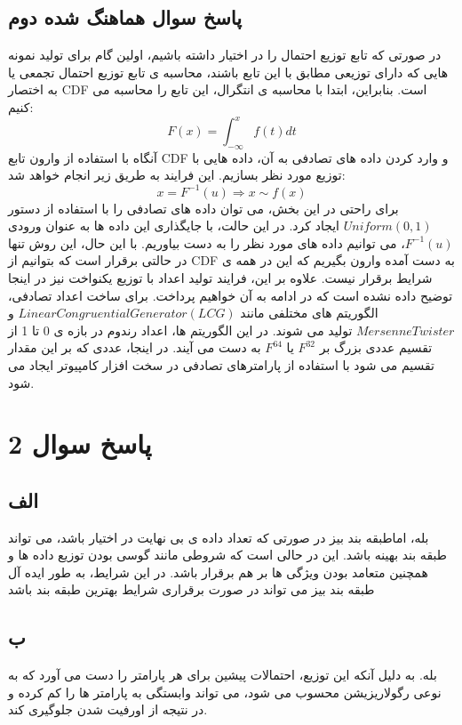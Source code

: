 \documentclass{article}
\begin{document}
\clearpage
\subsection{پاسخ سوال هماهنگ شده دوم}
در صورتی که تابع توزیع احتمال را در اختیار داشته باشیم، اولین گام برای تولید نمونه هایی که دارای توزیعی مطابق با این تابع باشند، محاسبه ی تابع توزیع احتمال تجمعی یا به اختصار CDF است. بنابراین، ابتدا با محاسبه ی انتگرال، این تابع را محاسبه می کنیم:
\begin{equation}
	F(x) = \int_{-\infty}^{x} f(t) dt
\end{equation}
آنگاه با استفاده از وارون تابع CDF و وارد کردن داده های تصادفی به آن، داده هایی با توزیع مورد نظر بسازیم. این فرایند به طریق زیر انجام خواهد شد:
\begin{equation}
	x = F^{-1}(u) \Rightarrow x \sim f(x)
\end{equation}
برای راحتی در این بخش، می توان داده های تصادفی را با استفاده از دستور $Uniform(0,1)$ ایجاد کرد. در این حالت، با جایگذاری این داده ها به عنوان ورودی $ F^{-1}(u)$، می توانیم داده های مورد نظر را به دست بیاوریم. با این حال، این روش تنها در حالتی برقرار است که بتوانیم از CDF به دست آمده وارون بگیریم که این در همه ی شرایط برقرار نیست. علاوه بر این، فرایند تولید اعداد با توزیع یکنواخت نیز در اینجا توضیح داده نشده است که در ادامه به آن خواهیم پرداخت.
برای ساخت اعداد تصادفی، الگوریتم های مختلفی مانند $Linear Congruential Generator (LCG)$ و $Mersenne Twister$ تولید می شوند. در این الگوریتم ها، اعداد رندوم در بازه ی 0 تا 1 از تقسیم عددی بزرگ بر $ F^{32}$ یا $ F^{64}$ به دست می آیند. در اینجا، عددی که بر این مقدار تقسیم می شود با استفاده از پارامترهای تصادفی در سخت افزار کامپیوتر ایجاد می شود.

\section{پاسخ سوال 2}
\subsection{الف}
بله، اماطبقه بند بیز در صورتی که تعداد داده ی بی نهایت در اختیار باشد، می تواند طبقه بند بهینه باشد. این در حالی است که شروطی مانند گوسی بودن توزیع داده ها و همچنین متعامد بودن ویژگی ها بر هم برقرار باشد. در این شرایط، به طور ایده آل طبقه بند بیز می تواند در صورت برقراری شرایط بهترین طبقه بند باشد

\subsection{ب}
بله. به دلیل آنکه این توزیع، احتمالات پیشین برای هر پارامتر را دست می آورد که به نوعی رگولاریزیشن محسوب می شود، می تواند وابستگی به پارامتر ها را کم کرده و در نتیجه از اورفیت شدن جلوگیری کند.
\end{document}

